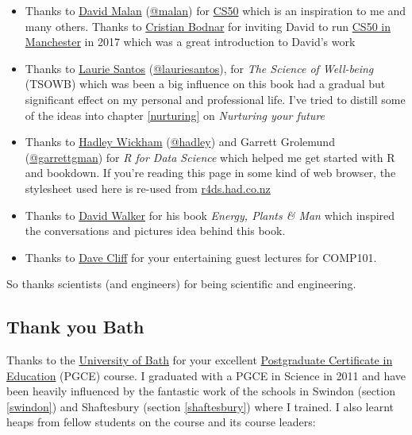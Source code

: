 \documentclass[
]{book}
\providecommand{\tightlist}{%
  \setlength{\itemsep}{0pt}\setlength{\parskip}{0pt}}
\begin{document}
\begin{itemize}
\tightlist
\item
  Thanks to \href{https://en.wikipedia.org/wiki/David_J._Malan}{David Malan} (\href{https://cs.harvard.edu/malan/}{@malan}) for \href{https://en.wikipedia.org/wiki/CS50}{CS50} which is an inspiration to me and many others. \citep{cs50, cs50zoom, CS502021} Thanks to \href{https://crisbodnar.github.io/}{Cristian Bodnar} for inviting David to run \href{http://cs50.hacksoc.com}{CS50 in Manchester} in 2017 which was a great introduction to David's work \citep{cs50mcr}
\item
  Thanks to \href{https://en.wikipedia.org/wiki/Laurie_R._Santos}{Laurie Santos} (\href{https://twitter.com/lauriesantos}{@lauriesantos}), for \emph{The Science of Well-being} (TSOWB) \citep{lauriesantos} which was been a big influence on this book had a gradual but significant effect on my personal and professional life. I've tried to distill some of the ideas into chapter \ref{nurturing} on \emph{Nurturing your future}
\item
  Thanks to \href{https://en.wikipedia.org/wiki/Hadley_Wickham}{Hadley Wickham} (\href{https://github.com/hadley}{@hadley}) and Garrett Grolemund (\href{https://github.com/garrettgman}{@garrettgman}) for \emph{R for Data Science} \citep{r4ds} which helped me get started with R and bookdown. If you're reading this page in some kind of web browser, the stylesheet used here is re-used from \href{https://r4ds.had.co.nz/}{r4ds.had.co.nz}
\item
  Thanks to \href{https://en.wikipedia.org/wiki/David_A._Walker_(scientist)}{David Walker} for his book \emph{Energy, Plants \& Man} which inspired the conversations and pictures idea behind this book. \citep{epm}
\item
  Thanks to \href{https://en.wikipedia.org/wiki/Dave_Cliff_(computer_scientist)}{Dave Cliff} for your entertaining guest lectures for COMP101.
\end{itemize}

So thanks scientists (and engineers) for being scientific and engineering. 🙏

\hypertarget{bath}{%
\subsection{Thank you Bath}\label{bath}}

Thanks to the \href{https://en.wikipedia.org/wiki/University_of_Bath}{University of Bath} for your excellent \href{https://en.wikipedia.org/wiki/Postgraduate_Certificate_in_Education}{Postgraduate Certificate in Education} (PGCE) course. I graduated with a PGCE in Science in 2011 and have been heavily influenced by the fantastic work of the schools in Swindon (section \ref{swindon}) and Shaftesbury (section \ref{shaftesbury}) where I trained. I also learnt heaps from fellow students on the course and its course leaders:
\end{document}
